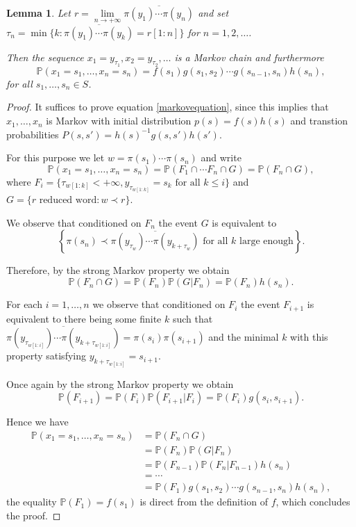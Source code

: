 \documentclass{article}
\newtheorem{lemma}{Lemma}
\newcommand{\Pof}[1]{\mathbb{P}\left(#1\right)}
\begin{document}
\begin{lemma}\label{markovlemma}
 Let \(r = \lim\limits_{n \to +\infty}\overline{\pi(y_1)\cdots \pi(y_n)}\) and set \(\tau_n = \min\lbrace k: \overline{\pi(y_1)\cdots \pi(y_k)} = r[1:n]\rbrace\) for \(n = 1,2,\ldots\).
 
 Then the sequence \(x_1 = y_{\tau_1},x_2 = y_{\tau_2},\ldots\) is a Markov chain and furthermore
 \begin{equation}\label{markovequation}
 \Pof{x_1 = s_1,\ldots, x_n = s_n} = f(s_1)g(s_1,s_2)\cdots g(s_{n-1},s_n)h(s_n),
 \end{equation}
 for all \(s_1,\ldots, s_n \in S\).
\end{lemma}
\begin{proof}
It suffices to prove equation \ref{markovequation}, since this implies that \(x_1,\ldots, x_n\) is Markov with initial distribution \(p(s) = f(s)h(s)\) and transtion probabilities \(P(s,s') = h(s)^{-1}g(s,s')h(s')\).

For this purpose we let \(w = \pi(s_1)\cdots \pi(s_n)\) and write
\begin{equation} 
\Pof{x_1 = s_1,\ldots, x_n = s_n} = \Pof{F_1 \cap \cdots F_n \cap G} = \Pof{F_n \cap G},
\end{equation}
where \(F_i = \lbrace \tau_{w[1:k]} < +\infty, y_{\tau_{w[1:k]}} = s_k\text{ for all }k \le i\rbrace\) and \(G = \lbrace r\text{ reduced word}: w \prec r\rbrace\).

We observe that conditioned on \(F_n\) the event \(G\) is equivalent to
\[\left\lbrace\pi(s_n) \prec \overline{\pi(y_{\tau_w})\cdots \pi(y_{k + \tau_w})}\text{ for all }k\text{ large enough}\right\rbrace.\]

Therefore, by the strong Markov property we obtain 
\begin{equation}\Pof{F_n \cap G} = \Pof{F_n}\Pof{G | F_n} = \Pof{F_n}h(s_n).
\end{equation}


For each \(i = 1,\ldots,n\) we observe that conditioned on \(F_i\) the event \(F_{i+1}\) is equivalent to there being some finite \(k\) such that \(\overline{\pi(y_{\tau_{w[1:i]}})\cdots \pi(y_{k + \tau_{w[1:i]}})} = \pi(s_i)\pi(s_{i+1})\) and the minimal \(k\) with this property satisfying \(y_{k + \tau_{w[1:i]}} = s_{i+1}\).

Once again by the strong Markov property we obtain 
\begin{equation}
\Pof{F_{i+1}} = \Pof{F_i}\Pof{F_{i+1}|F_i} = \Pof{F_i}g(s_i,s_{i+1}).
\end{equation}


Hence we have 
\begin{align*}
 \Pof{x_1 = s_1,\ldots, x_n = s_n} &= \Pof{F_n \cap G}
 \\ &= \Pof{F_n}\Pof{G|F_n}
 \\ &= \Pof{F_{n-1}}\Pof{F_n|F_{n-1}}h(s_n)
 \\ &= \cdots 
 \\ &= \Pof{F_1}g(s_1,s_2)\cdots g(s_{n-1},s_n)h(s_n),
\end{align*}
the equality \(\Pof{F_1} = f(s_1)\) is direct from the definition of \(f\), which concludes the proof.
\end{proof}
\end{document}
